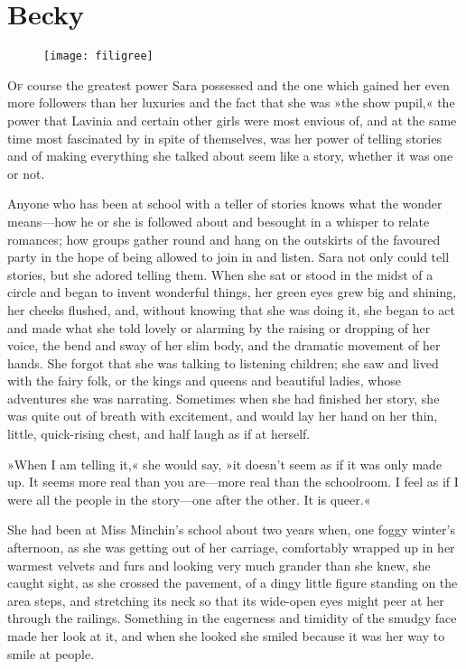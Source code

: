 \chapter{Becky}

\begin{figure}[t!]
\centering
\texttt{[image: filigree]}
\end{figure}

\lettrine[lines=5]{O}{f} course the greatest power Sara possessed and the one which gained her even more followers than her luxuries and the fact that she was »the show pupil,« the power that Lavinia and certain other girls were most envious of, and at the same time most fascinated by in spite of themselves, was her power of telling stories and of making everything she talked about seem like a story, whether it was one or not.

Anyone who has been at school with a teller of stories knows what the wonder means—how he or she is followed about and besought in a whisper to relate romances; how groups gather round and hang on the outskirts of the favoured party in the hope of being allowed to join in and listen. Sara not only could tell stories, but she adored telling them. When she sat or stood in the midst of a circle and began to invent wonderful things, her green eyes grew big and shining, her cheeks flushed, and, without knowing that she was doing it, she began to act and made what she told lovely or alarming by the raising or dropping of her voice, the bend and sway of her slim body, and the dramatic movement of her hands. She forgot that she was talking to listening children; she saw and lived with the fairy folk, or the kings and queens and beautiful ladies, whose adventures she was narrating. Sometimes when she had finished her story, she was quite out of breath with excitement, and would lay her hand on her thin, little, quick-rising chest, and half laugh as if at herself.

»When I am telling it,« she would say, »it doesn't seem as if it was only made up. It seems more real than you are—more real than the schoolroom. I feel as if I were all the people in the story—one after the other. It is queer.«

She had been at Miss Minchin's school about two years when, one foggy winter's afternoon, as she was getting out of her carriage, comfortably wrapped up in her warmest velvets and furs and looking very much grander than she knew, she caught sight, as she crossed the pavement, of a dingy little figure standing on the area steps, and stretching its neck so that its wide-open eyes might peer at her through the railings. Something in the eagerness and timidity of the smudgy face made her look at it, and when she looked she smiled because it was her way to smile at people.

